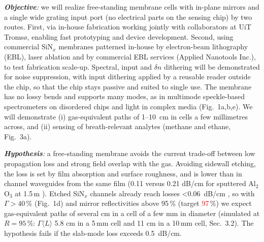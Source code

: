 \documentclass[a4paper,12pt]{article}
\newcommand{\red}[1]{\textcolor{red}{#1}}
\newcommand{\wc}[1]{\textcolor{dkmaroon}{#1}} %
\begin{document}
\emph{\textbf{Objective}:} we will realize free-standing membrane cells with in-plane mirrors and a single wide grating input port (no electrical parts on the sensing chip) by two routes. First, via in-house fabrication working jointly with collaborators at UiT Tromsø, enabling fast prototyping and device development. Second, using commercial SiN$_x$ membranes patterned in-house by electron-beam lithography (EBL), laser ablation and by commercial EBL services (Applied Nanotools Inc.), to test fabrication scale-up. Spectral, input and $\delta n$ dithering will be demonstrated for noise suppression, with input dithering applied by a reusable reader outside the chip, so that the chip stays passive and suited to single use. The membrane has no lossy bends and supports many modes, as in multimode speckle-based spectrometers on disordered chips \cite{Redding2013} and light in complex media \cite{RotterGigan2017} (Fig.~1a,b,e). We will demonstrate (i)
gas-equivalent paths of 1--10~cm in cells a few millimetres across, and (ii) sensing of breath-relevant analytes
(methane and ethane, Fig.~3a).

\emph{\textbf{Hypothesis}:} a free-standing membrane avoids the current trade-off between low propagation loss and strong field overlap with the gas. Avoiding sidewall etching, the loss is set by film absorption and surface roughness, and is lower than in channel waveguides from the same film (0.11 versus 0.21 dB/cm for sputtered Al$_2$O$_3$ at 1.5\,\textmu{}m \cite{Worhoff2008}). %
Etched SiN$_x$ channels already reach losses <0.06~dB/cm \cite{Ji2023}, so with $\Gamma>40$\,\% (Fig.~1d) and mirror reflectivities above 95\,\% (target \red{97}\,\%) we expect gas-equivalent paths of several cm in a cell of a few mm in diameter\wc{ (simulated at $R=95\,\%$: $\Gamma\langle L\rangle$ 5.8 cm in a 5\,mm cell and 11 cm in a 10\,mm cell, Sec.~3.2)}. The hypothesis fails if the slab-mode loss exceeds 0.5~dB/cm. %
\end{document}
